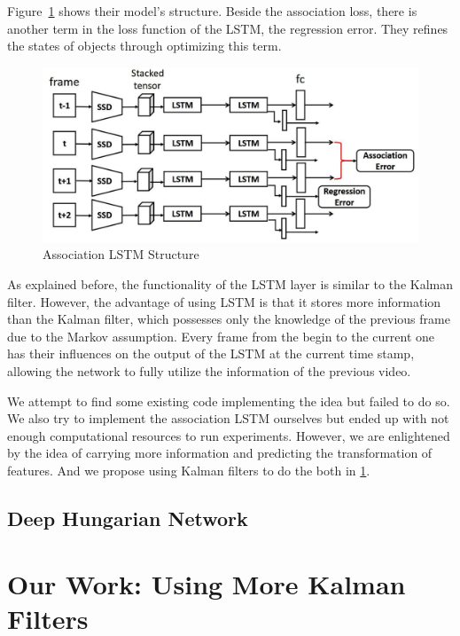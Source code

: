 \documentclass[conference]{IEEEtran}
\begin{document}
Figure~\ref{fig:lstm-struct} shows their model's structure.
Beside the association loss, there is another term in the loss function of the LSTM, the regression error.
They refines the states of objects through optimizing this term.

\begin{figure}[h]
    \centering
    \includegraphics[width=0.99\linewidth]{fig/assoc_lstm.png}
    \caption{Association LSTM Structure\protect\footnotemark}
    \label{fig:lstm-struct}
\end{figure}

As explained before, the functionality of the LSTM layer is similar to the Kalman filter.
However, the advantage of using LSTM is that it stores more information than the Kalman filter, which possesses only the knowledge of the previous frame due to the Markov assumption.
Every frame from the begin to the current one has their influences on the output of the LSTM at the current time stamp, allowing the network to fully utilize the information of the previous video.

We attempt to find some existing code implementing the idea but failed to do so.
We also try to implement the association LSTM ourselves but ended up with not enough computational resources to run experiments.
However, we are enlightened by the idea of carrying more information and predicting the transformation of features.
And we propose using Kalman filters to do the both in \cref{sec:our-work}.

\subsection{Deep Hungarian Network}



\section{Our Work: Using More Kalman Filters}
\label{sec:our-work}
\end{document}
